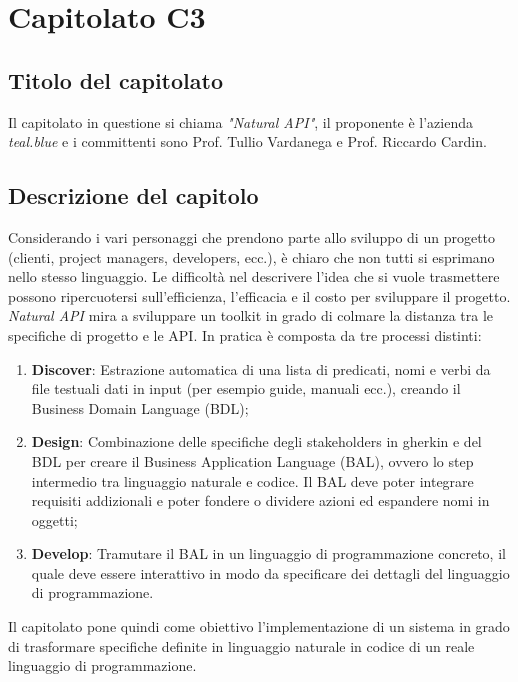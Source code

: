 \section{Capitolato C3}
\subsection{Titolo del capitolato}
Il capitolato in questione si chiama \textit{"Natural API"}, il proponente è l'azienda \textit{teal.blue} e i committenti sono Prof. Tullio Vardanega e Prof. Riccardo Cardin.

\subsection{Descrizione del capitolo}
Considerando i vari personaggi che prendono parte allo sviluppo di un progetto (clienti, project managers, developers, ecc.), è chiaro che non tutti si esprimano nello stesso linguaggio. Le difficoltà nel descrivere l'idea che si vuole trasmettere possono ripercuotersi sull'efficienza, l'efficacia e il costo per sviluppare il progetto. \textit{Natural API} mira a sviluppare un toolkit in grado di colmare la distanza tra le specifiche di progetto e le API. In pratica è composta da tre processi distinti:
\begin{enumerate}
\item \textbf{Discover}: Estrazione automatica di una lista di predicati, nomi e verbi da file testuali dati in input (per esempio guide, manuali ecc.), creando il Business Domain Language (BDL);
\item \textbf{Design}: Combinazione delle specifiche degli stakeholders in gherkin e del BDL per creare il Business Application Language (BAL), ovvero lo step intermedio tra linguaggio naturale e codice. Il BAL deve poter integrare requisiti addizionali e poter fondere o dividere azioni ed espandere nomi in oggetti;
\item \textbf{Develop}: Tramutare il BAL in un linguaggio di programmazione concreto, il quale deve essere interattivo in modo da specificare dei dettagli del linguaggio di programmazione.
\end{enumerate}

Il capitolato pone quindi come obiettivo l'implementazione di un sistema in grado di trasformare specifiche definite in linguaggio naturale in codice di un reale linguaggio di programmazione.

